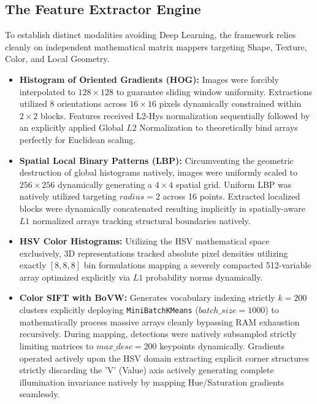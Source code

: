 \documentclass[11pt, a4paper]{article}
\begin{document}
\subsection{The Feature Extractor Engine}
To establish distinct modalities avoiding Deep Learning, the framework relies cleanly on independent mathematical matrix mappers targeting Shape, Texture, Color, and Local Geometry.

\begin{itemize}
    \item \textbf{Histogram of Oriented Gradients (HOG):} Images were forcibly interpolated to $128 \times 128$ to guarantee sliding window uniformity. Extractions utilized 8 orientations across $16 \times 16$ pixels dynamically constrained within $2 \times 2$ blocks. Features received L2-Hys normalization sequentially followed by an explicitly applied Global $L2$ Normalization to theoretically bind arrays perfectly for Euclidean scaling.
    \item \textbf{Spatial Local Binary Patterns (LBP):} Circumventing the geometric destruction of global histograms natively, images were uniformly scaled to $256 \times 256$ dynamically generating a $4 \times 4$ spatial grid. Uniform LBP was natively utilized targeting $radius=2$ across 16 points. Extracted localized blocks were dynamically concatenated resulting implicitly in spatially-aware $L1$ normalized arrays tracking structural boundaries natively.
    \item \textbf{HSV Color Histograms:} Utilizing the HSV mathematical space exclusively, 3D representations tracked absolute pixel densities utilizing exactly $[8, 8, 8]$ bin formulations mapping a severely compacted 512-variable array optimized explicitly via $L1$ probability norms dynamically.
    \item \textbf{Color SIFT with BoVW:} Generates vocabulary indexing strictly $k=200$ clusters explicitly deploying \texttt{MiniBatchKMeans} ($batch\_size=1000$) to mathematically process massive arrays cleanly bypassing RAM exhaustion recursively. During mapping, detections were natively subsampled strictly limiting matrices to $max\_desc=200$ keypoints dynamically. Gradients operated actively upon the HSV domain extracting explicit corner structures strictly discarding the 'V' (Value) axis actively generating complete illumination invariance natively by mapping Hue/Saturation gradients seamlessly.
\end{itemize}
\end{document}
